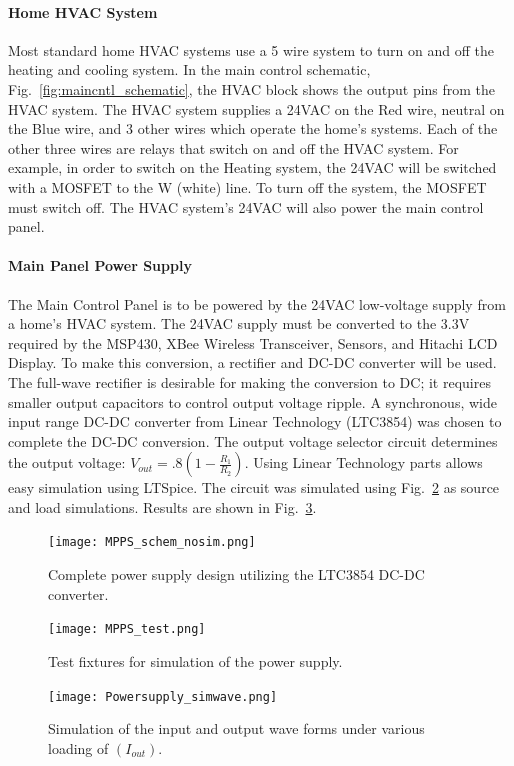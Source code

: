 \paragraph{Home HVAC System}
Most standard home HVAC systems use a 5 wire system to turn on and off the heating and cooling system. In the main control schematic, Fig.~\ref{fig:maincntl_schematic}, the HVAC block shows the output pins from the HVAC system. The HVAC system supplies a 24VAC on the Red wire, neutral on the Blue wire, and 3 other wires which operate the home's systems. Each of the other three wires are relays that switch on and off the HVAC system. For example, in order to switch on the Heating system, the 24VAC will be switched with a MOSFET to the W (white) line. To turn off the system, the MOSFET must switch off. The HVAC system's 24VAC will also power the main control panel.
\paragraph{Main Panel Power Supply}
The Main Control Panel is to be powered by the 24VAC low-voltage supply from a home's HVAC system. The 24VAC supply must be converted to the 3.3V required by the MSP430, XBee Wireless Transceiver, Sensors, and Hitachi LCD Display. To make this conversion, a rectifier and DC-DC converter will be used. The full-wave rectifier is desirable for making the conversion to DC; it requires smaller output capacitors to control output voltage ripple. A synchronous, wide input range DC-DC converter from Linear Technology (LTC3854) was chosen to complete the DC-DC conversion. The output voltage selector circuit determines the output voltage: $V_{out}=.8(1-\frac{R_1}{R_2})$. Using Linear Technology parts allows easy simulation using LTSpice. The circuit was simulated using Fig.~\ref{fig:MPPS_test} as source and load simulations. Results are shown in Fig.~\ref{fig:powersupply_simwave}.
\begin{figure}
\centering
\texttt{[image: MPPS\_schem\_nosim.png]}
\caption{Complete power supply design utilizing the LTC3854 DC-DC converter.}
\label{fig:MPPS_schem_nosim}
\end{figure}
\begin{figure}
\centering
\texttt{[image: MPPS\_test.png]}
\caption{Test fixtures for simulation of the power supply.}
\label{fig:MPPS_test}
\end{figure}
\begin{figure}
\centering
\texttt{[image: Powersupply\_simwave.png]}
\caption{Simulation of the input and output wave forms under various loading of $(I_{out})$.}
\label{fig:powersupply_simwave}
\end{figure}
